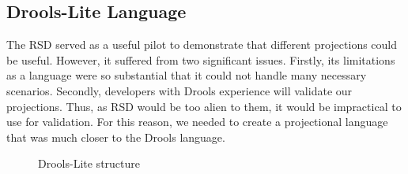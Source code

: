 \newpage
\subsection{Drools-Lite Language}
\label{section:DroolsLite}

The RSD served as a useful pilot to demonstrate that different projections could be useful. 
However, it suffered from two significant issues.
Firstly, its limitations as a language were so substantial that it could not handle many necessary scenarios.
Secondly, developers with Drools experience will validate our projections. 
Thus, as RSD would be too alien to them, it would be impractical to use for validation. 
For this reason, we needed to create a projectional language that was much closer to the Drools language.

\begin{figure}[htbp]
    \centering
    \caption{Drools-Lite structure}
    \label{fig:DroolsLiteDiagram}
\end{figure}
 
